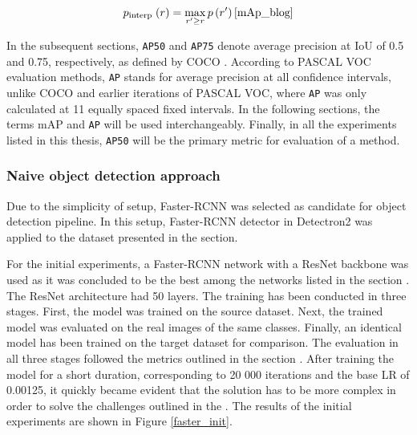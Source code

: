 \documentclass[english, 12pt, a4paper, elec, utf8, a-1b, online]{aaltothesis}
\begin{document}
\begin{equation}
p_{\text {interp }}(r)=\max _{r^{\prime} \geq r} p\left(r^{\prime}\right)
\label{interp}
\cite{mAp_blog}  
\end{equation}

In the subsequent sections, \texttt{AP50} and \texttt{AP75} denote average precision at IoU of 0.5 and 0.75, respectively, as defined by COCO \cite{Lin2014}. According to PASCAL VOC \cite{Everingham10} evaluation methods, \texttt{AP} stands for average precision at all confidence intervals, unlike COCO \cite{Lin2014} and earlier iterations of PASCAL VOC, where \texttt{AP} was only calculated at 11 equally spaced fixed intervals. In the following sections, the terms mAP and \texttt{AP} will be used interchangeably. Finally, in all the experiments listed in this thesis, \texttt{AP50} will be the primary metric for evaluation of a method.  


\subsubsection{Naive object detection approach}
\label{naive} 
Due to the simplicity of setup, Faster-RCNN \cite{ima} was selected as  candidate for object detection pipeline. In this setup, Faster-RCNN detector in Detectron2  \cite{wu2019Detectron2} was applied to the dataset presented in the  section. 

For the initial experiments, a Faster-RCNN network with a ResNet backbone was used as it was concluded to be the best among the networks listed in the section . The ResNet architecture had 50 layers. The training has been conducted in three stages. First, the model was trained on the source dataset. Next, the trained model was evaluated on the real images of the same classes. Finally, an identical model has been trained on the target dataset for comparison. The evaluation in all three stages followed the metrics outlined in the section . After training the model for a short duration, corresponding to 20 000 iterations and the base LR of 0.00125, it quickly became evident that the solution has to be more complex in order to solve the challenges outlined in the . The results of the initial experiments are shown in Figure \ref{faster_init}.
\end{document}
